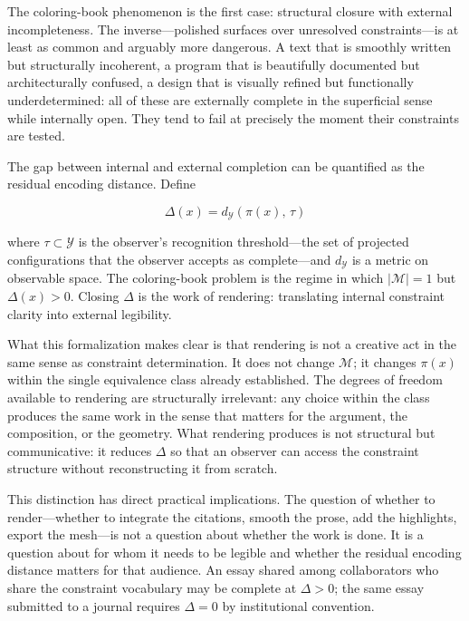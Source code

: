 \documentclass[12pt, twoside]{article}
\theoremstyle{plain}
\theoremstyle{definition}
\theoremstyle{remark}
\begin{document}
The coloring-book phenomenon is the first case: structural closure with external incompleteness. The inverse---polished surfaces over unresolved constraints---is at least as common and arguably more dangerous. A text that is smoothly written but structurally incoherent, a program that is beautifully documented but architecturally confused, a design that is visually refined but functionally underdetermined: all of these are externally complete in the superficial sense while internally open. They tend to fail at precisely the moment their constraints are tested.

The gap between internal and external completion can be quantified as the residual encoding distance. Define

\[
\Delta(x) = d_{\mathcal{Y}}(\pi(x),\, \tau)
\]

where $\tau \subset \mathcal{Y}$ is the observer's recognition threshold---the set of projected configurations that the observer accepts as complete---and $d_{\mathcal{Y}}$ is a metric on observable space. The coloring-book problem is the regime in which $|\mathcal{M}| = 1$ but $\Delta(x) > 0$. Closing $\Delta$ is the work of rendering: translating internal constraint clarity into external legibility.

What this formalization makes clear is that rendering is not a creative act in the same sense as constraint determination. It does not change $\mathcal{M}$; it changes $\pi(x)$ within the single equivalence class already established. The degrees of freedom available to rendering are structurally irrelevant: any choice within the class produces the same work in the sense that matters for the argument, the composition, or the geometry. What rendering produces is not structural but communicative: it reduces $\Delta$ so that an observer can access the constraint structure without reconstructing it from scratch.

This distinction has direct practical implications. The question of whether to render---whether to integrate the citations, smooth the prose, add the highlights, export the mesh---is not a question about whether the work is done. It is a question about for whom it needs to be legible and whether the residual encoding distance matters for that audience. An essay shared among collaborators who share the constraint vocabulary may be complete at $\Delta > 0$; the same essay submitted to a journal requires $\Delta = 0$ by institutional convention.

\end{document}
